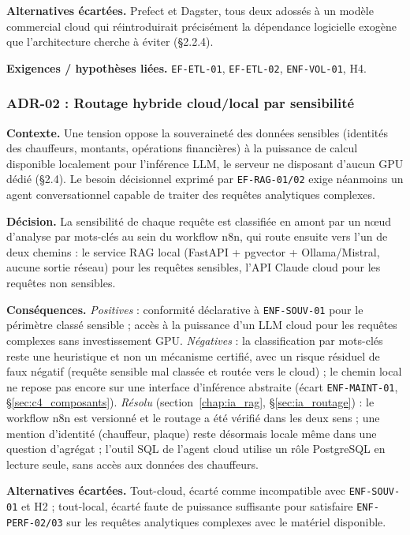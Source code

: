 \textbf{Alternatives écartées.} Prefect et Dagster, tous deux adossés à un modèle commercial cloud qui réintroduirait précisément la dépendance logicielle exogène que l'architecture cherche à éviter (§2.2.4).

\textbf{Exigences / hypothèses liées.} \texttt{EF-ETL-01}, \texttt{EF-ETL-02}, \texttt{ENF-VOL-01}, H4.

\subsubsection*{ADR-02 : Routage hybride cloud/local par sensibilité}
\textbf{Contexte.} Une tension oppose la souveraineté des données sensibles (identités des chauffeurs, montants, opérations financières) à la puissance de calcul disponible localement pour l'inférence LLM, le serveur ne disposant d'aucun GPU dédié (§2.4). Le besoin décisionnel exprimé par \texttt{EF-RAG-01/02} exige néanmoins un agent conversationnel capable de traiter des requêtes analytiques complexes.

\textbf{Décision.} La sensibilité de chaque requête est classifiée en amont par un nœud d'analyse par mots-clés au sein du workflow n8n, qui route ensuite vers l'un de deux chemins : le service RAG local (FastAPI + pgvector + Ollama/Mistral, aucune sortie réseau) pour les requêtes sensibles, l'API Claude cloud pour les requêtes non sensibles.

\textbf{Conséquences.} \textit{Positives} : conformité déclarative à \texttt{ENF-SOUV-01} pour le périmètre classé sensible ; accès à la puissance d'un LLM cloud pour les requêtes complexes sans investissement GPU. \textit{Négatives} : la classification par mots-clés reste une heuristique et non un mécanisme certifié, avec un risque résiduel de faux négatif (requête sensible mal classée et routée vers le cloud) ; le chemin local ne repose pas encore sur une interface d'inférence abstraite (écart \texttt{ENF-MAINT-01}, §\ref{sec:c4_composants}). \textit{Résolu} (section~\ref{chap:ia_rag}, §\ref{sec:ia_routage}) : le workflow n8n est versionné et le routage a été vérifié dans les deux sens ; une mention d'identité (chauffeur, plaque) reste désormais locale même dans une question d'agrégat ; l'outil SQL de l'agent cloud utilise un rôle PostgreSQL en lecture seule, sans accès aux données des chauffeurs.

\textbf{Alternatives écartées.} Tout-cloud, écarté comme incompatible avec \texttt{ENF-SOUV-01} et H2 ; tout-local, écarté faute de puissance suffisante pour satisfaire \texttt{ENF-PERF-02/03} sur les requêtes analytiques complexes avec le matériel disponible.

